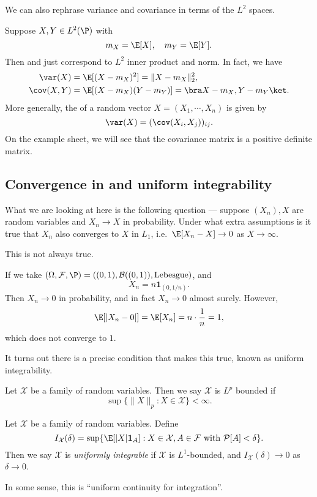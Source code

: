 \documentclass[a4paper]{article}
\begin{document}
We can also rephrase variance and covariance in terms of the $L^2$ spaces.

Suppose $X, Y \in L^2(\P)$ with
\[
  m_X = \E[X],\quad m_Y = \E[Y].
\]
Then  and  just correspond to $L^2$ inner product and norm. In fact, we have
\begin{align*}
  \var(X) &= \E[(X - m_X)^2] = \|X - m_X\|_2^2,\\
  \cov(X, Y) &= \E[(X - m_X)(Y - m_Y)] = \bra X - m_X, Y - m_Y\ket.
\end{align*}
More generally, the  of a random vector $X = (X_1, \cdots, X_n)$ is given by
\[
  \var(X) =(\cov(X_i, X_j))_{ij}.
\]
On the example sheet, we will see that the covariance matrix is a positive definite matrix.

\subsection{Convergence in  and uniform integrability}
What we are looking at here is the following question --- suppose $(X_n), X$ are random variables and $X_n \to X$ in probability. Under what extra assumptions is it true that $X_n$ also converges to $X$ in $L_1$, i.e.\ $\E[X_n - X] \to 0$ as $X \to \infty$.

This is not always true.

\begin{eg}
  If we take $(\Omega, \mathcal{F}, \P) = ((0, 1), \mathcal{B}((0, 1)), \text{Lebesgue})$, and
  \[
    X_n = n\mathbf{1}_{(0, 1/n)}.
  \]
  Then $X_n \to 0$ in probability, and in fact $X_n \to 0$ almost surely. However,
  \[
    \E[|X_n - 0|] = \E[X_n] = n \cdot \frac{1}{n} = 1,
  \]
  which does not converge to $1$.
\end{eg}

It turns out there is a precise condition that makes this true, known as uniform integrability.

\begin{defi}[$L^p$-bounded]
  Let $\mathcal{X}$ be a family of random variables. Then we say $\mathcal{X}$ is $L^p$ bounded if
  \[
    \sup\{\|X\|_p: X \in \mathcal{X}\} < \infty.
  \]
\end{defi}

\begin{defi}
  Let $\mathcal{X}$ be a family of random variables. Define
  \[
    I_\mathcal{X}(\delta) = \sup\{\E[|X|\mathbf{1}_A]: X \in \mathcal{X}, A \in \mathcal{F} \text{ with }\mathcal{P}[A] < \delta\}.
  \]
  Then we say $\mathcal{X}$ is \emph{uniformly integrable} if $\mathcal{X}$ is $L^1$-bounded, and $I_\mathcal{X}(\delta) \to 0$ as $\delta \to 0$.
\end{defi}
In some sense, this is ``uniform continuity for integration''.
\end{document}
